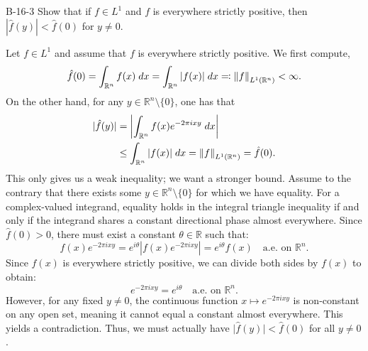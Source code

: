 \documentclass{article}
\begin{document}
	\begin{prb}{B-16-3}
		Show that if $f \in L^1$ and $f$ is everywhere strictly positive, then $|\hat{f}(y)| < \hat{f}(0)$ for $y \neq 0$. 
	\end{prb}
	Let $f \in L^1$ and assume that $f$ is everywhere strictly positive. We first compute, 
	\begin{equation*}
		\hat{f}(0) = \int_{\mathbb{R}^{n}}f(x)\;dx = \int_{\mathbb{R}^{n}}|f(x)|\;dx \eqqcolon \left\Vert f \right\Vert_{L^{1}(\mathbb{R}^{n})} < \infty. 
	\end{equation*}
	On the other hand, for any $y \in \mathbb{R}^{n}\setminus \{0\}$, one has that 
	\begin{align*}
		\begin{split}
			|\hat{f}(y)| &= \left| \int_{\mathbb{R}^{n}}f(x)e^{-2\pi i x y}\;dx \right| \\
			&\leq \int_{\mathbb{R}^{n}}|f(x)|\;dx = \left\Vert f \right\Vert_{L^{1}(\mathbb{R}^{n})} = \hat{f}(0). 
		\end{split}
	\end{align*}
	This only gives us a weak inequality; we want a stronger bound. Assume to the contrary that there exists some $y \in \mathbb{R}^{n}\setminus \{0\}$ for which we have equality. For a complex-valued integrand, equality holds in the integral triangle inequality if and only if the integrand shares a constant directional phase almost everywhere. Since $\hat{f}(0) > 0$, there must exist a constant $\theta \in \mathbb{R}$ such that:
	\begin{equation*}
		f(x)e^{-2\pi i x y} = e^{i\theta} |f(x)e^{-2\pi i x y}| = e^{i\theta} f(x) \quad \text{a.e. on } \mathbb{R}^n.
	\end{equation*}
	Since $f(x)$ is everywhere strictly positive, we can divide both sides by $f(x)$ to obtain:
	\begin{equation*}
		e^{-2\pi i x y} = e^{i\theta} \quad \text{a.e. on } \mathbb{R}^n.
	\end{equation*}
	However, for any fixed $y \neq 0$, the continuous function $x \mapsto e^{-2\pi i x y}$ is non-constant on any open set, meaning it cannot equal a constant almost everywhere. This yields a contradiction. Thus, we must actually have $\vert{}\hat{f}(y)\vert{} < \hat{f}(0)$ for all $y \neq 0$.
	
\end{document}
